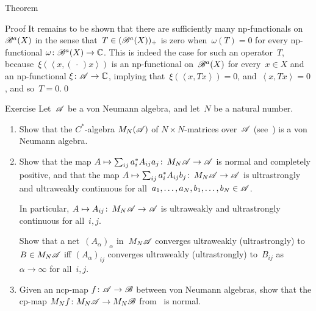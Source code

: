 \documentclass[a]{subfiles}
\begin{document}
\begin{parsec}
\begin{point}[bah-vn]{Theorem}
\begin{point}{Proof}
It remains to be shown that
there are sufficiently many np-functionals on $\mathscr{B}^a(X)$
in the sense that~$T\in(\mathscr{B}^a(X))_+$ is zero
when~$\omega(T)=0$ for every np-functional $\omega\colon \mathscr{B}^a(X)\to\mathbb{C}$.
This is indeed
the case for such an operator~$T$,
because~$\xi(\left<x,(\,\cdot\,)x\right>)$
is an np-functional on~$\mathscr{B}^a(X)$
for every~$x\in X$
and an np-functional $\xi\colon \mathscr{A}\to\mathbb{C}$,
implying that~$\xi(\left<x,Tx\right>)=0$,
and~$\left<x,Tx\right>=0$,
and so~$T=0$.\qed
\end{point}
\end{point}
\begin{point}[mn-vna]{Exercise}%
Let~$\mathscr{A}$ be a von Neumann algebra,
and let~$N$ be a natural number.
\begin{enumerate}
\item
Show 
that the $C^*$-algebra
$M_N(\mathscr{A})$ of $N\times N$-matrices over~$\mathscr{A}$ (see~)
is a von Neumann algebra.
\item
Show that
the map $A\mapsto \sum_{ij} a_i^* A_{ij} a_j\colon\, M_N\mathscr{A}\to \mathscr{A}$
is normal and completely positive,
and that
the map $A\mapsto \sum_{ij} a_i^* A_{ij} b_j\colon\, M_N\mathscr{A}\to\mathscr{A}$
is ultrastrongly and ultraweakly continuous
for all~$a_1,\dotsc,a_N,b_1,\dotsc,b_N\in\mathscr{A}$.

In particular, $A\mapsto A_{ij}\colon\,M_N\mathscr{A}\to\mathscr{A}$
is ultraweakly and ultrastrongly continuous
for all~$i,j$.

Show that a net~$(A_\alpha)_\alpha$
in~$M_N\mathscr{A}$
converges ultraweakly (ultrastrongly)
to $B\in M_N\mathscr{A}$
iff $(A_\alpha)_{ij}$ converges ultraweakly (ultrastrongly)
to~$B_{ij}$ as~$\alpha\to\infty$ for all~$i,j$.
\item
Given an ncp-map $f\colon \mathscr{A}\to\mathscr{B}$
between von Neumann algebras,
show that the cp-map $M_N f\colon M_N\mathscr{A}\to M_N\mathscr{B}$
from~ is normal.
\end{enumerate}
\end{point}
\end{parsec}
\end{document}
